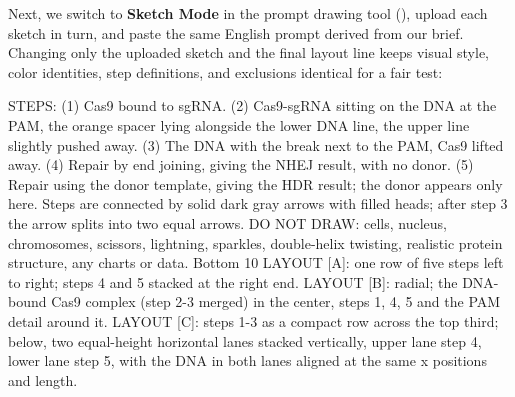 Next, we switch to \textbf{Sketch Mode} in the \scidraw{} prompt drawing tool (), upload each sketch in turn, and paste the same English prompt derived from our brief. Changing only the uploaded sketch and the final layout line keeps visual style, color identities, step definitions, and exclusions identical for a fair test:


\begin{Prompt}
STEPS: (1) Cas9 bound to sgRNA. (2) Cas9-sgRNA sitting on the DNA at the PAM, the orange spacer lying alongside the lower DNA line, the upper line slightly pushed away. (3) The DNA with the break next to the PAM, Cas9 lifted away. (4) Repair by end joining, giving the NHEJ result, with no donor. (5) Repair using the donor template, giving the HDR result; the donor appears only here. Steps are connected by solid dark gray arrows with filled heads; after step 3 the arrow splits into two equal arrows.
DO NOT DRAW: cells, nucleus, chromosomes, scissors, lightning, sparkles, double-helix twisting, realistic protein structure, any charts or data. Bottom 10%
LAYOUT [A]: one row of five steps left to right; steps 4 and 5 stacked at the right end.
LAYOUT [B]: radial; the DNA-bound Cas9 complex (step 2-3 merged) in the center, steps 1, 4, 5 and the PAM detail around it.
LAYOUT [C]: steps 1-3 as a compact row across the top third; below, two equal-height horizontal lanes stacked vertically, upper lane step 4, lower lane step 5, with the DNA in both lanes aligned at the same x positions and length.
\end{Prompt}


